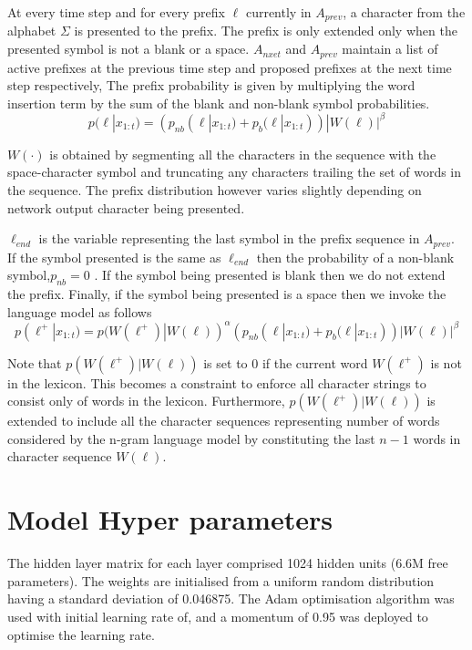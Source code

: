 At every  time step and for every prefix $\ell$ currently in $A_{prev}$, a character from the alphabet $\Sigma$ is presented to the prefix. The prefix is only extended only when the presented symbol is not a blank or a space. $A_{nxet}$ and $A_{prev}$ maintain a list of active prefixes at the previous time step and proposed prefixes at the next time step respectively, The prefix probability is given by multiplying the word insertion term by the sum of the blank and non-blank symbol probabilities.
\begin{equation}
p(\ell|x_{1:t})=(p_{nb}(\ell|x_{1:t})+p_b(\ell|x_{1:t}))|W(\ell)|^\beta
\label{eqn_c6_decoder03}
\end{equation}

$W(\cdot)$ is obtained by segmenting all the characters in the sequence with the space-character symbol and truncating any characters trailing the  set of words in the sequence.  The prefix distribution however varies slightly depending on network output character being presented.

$\ell_{end}$ is the variable representing the last symbol in the prefix sequence in $A_{prev}$. If the symbol presented is the same as $\ell_{end}$ then the probability of a non-blank symbol,$p_{nb}=0$ . If the symbol being presented is blank then we do not extend the prefix.  Finally, if the symbol being presented is a space then we invoke the language model as follows
\begin{equation}
p(\ell^+|x_{1:t})=p(W(\ell^+)|W(\ell))^\alpha(p_{nb}(\ell|x_{1:t})+p_b(\ell|x_{1:t}))|W(\ell)|^\beta
\label{eqn_c6_decoder03}
\end{equation}

Note that $p(W(\ell^+)|W(\ell))$ is set to $0$ if the current word $W(\ell^+)$ is not in the lexicon. This becomes a constraint to enforce all character strings to consist only of words in the lexicon.  Furthermore,  $p(W(\ell^+)|W(\ell))$ is extended to include all the character sequences representing number of words considered by the n-gram language model by constituting the last $n-1$ words in character sequence $W(\ell)$.

\section{Model Hyper parameters}
The hidden layer matrix for each layer comprised 1024 hidden units (6.6M free parameters).  The weights are initialised from a uniform random distribution having a standard deviation of 0.046875.  The Adam optimisation algorithm \citep{kingma2014adam} was used with initial learning rate of, and a momentum of 0.95 was deployed to optimise the learning rate.

